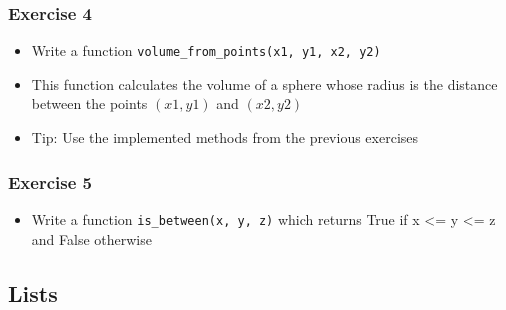 \documentclass[10pt, a4paper]{beamer} %
\begin{document}
{\begin{frame}[c, fragile]
\end{frame}


\begin{frame}[c, fragile]\frametitle{Exercise 4}
\begin{itemize}
    \item Write a function \texttt{volume\_from\_points(x1, y1, x2, y2)}
    \item  This function calculates the volume of a sphere whose radius is the distance between the points $(x1, y1)$ and $(x2, y2)$
    \item  Tip: Use the implemented methods from the previous exercises
\end{itemize}
    
\end{frame}

\begin{frame}[t, fragile]\frametitle{Exercise 5}
\begin{itemize}
    \item Write a function \texttt{is\_between(x, y, z)} which returns True if x <= y <=
z and False otherwise
\end{itemize}
    
\end{frame}
}


\subsection{Lists} %
\label{sub:lists}
\end{document}
